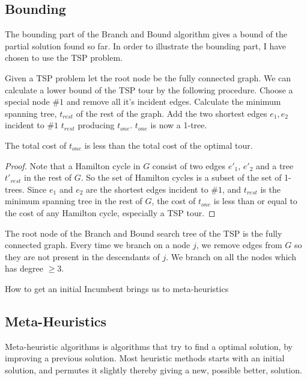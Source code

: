 \documentclass[10pt]{article}
\begin{document}
\subsection{Bounding} %
\label{sub:bounding}
The bounding part of the Branch and Bound algorithm gives a bound of the partial solution found so far. In order to illustrate the bounding part, I have chosen to use the TSP problem. 

Given a TSP problem let the root node be the fully connected graph. We can calculate a lower bound of the TSP tour by the following procedure. Choose a special node $\#1$ and remove all it's incident edges. Calculate the minimum spanning tree, $t_{rest}$ of the rest of the graph. Add the two shortest edges $e_1,e_2$ incident to $\#1$ $t_{rest}$ producing $t_{one}$. $t_{one}$  is now a 1-tree. 

\begin{definition}
The total cost of $t_{one}$ is less than the total cost of the optimal tour.  
\end{definition}

\begin{proof}
  Note that a Hamilton cycle in $G$ consist of two edges $e'_1$, $e'_2$ and a tree $t'_{rest}$ in the rest of $G$. So the set of Hamilton cycles is a subset of the set of 1-trees. Since $e_1$ and $e_2$ are the shortest edges incident to $\#1$, and $t_{rest}$ is the minimum spanning tree in the rest of $G$, the cost of $t_{one}$ is less than or equal to the cost of any Hamilton cycle, especially a TSP tour.
\end{proof}

The root node of the Branch and Bound search tree of the TSP is the fully connected graph. Every time we branch on a node $j$, we remove edges from $G$ so they are not present in the descendants of $j$. We branch on all the nodes which has degree $\geq 3$.

How to get an initial Incumbent brings us to meta-heuristics



\subsection{Meta-Heuristics} %
\label{sub:heuristics}

Meta-heuristic algorithms is algorithms that try to find a optimal solution, by improving a previous solution. Most heuristic methods starts with an initial solution, and permutes it slightly thereby giving a new, possible better, solution. 
\end{document}
